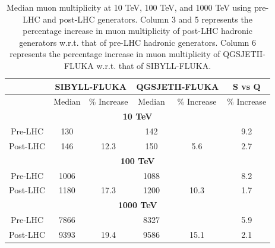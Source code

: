 \documentclass[12pt]{article}
\begin{document}
\begin{table}
\centering
\begin{tabular}{ | c | c | c | c | c | c |} 
\hline
& \multicolumn{2}{|c|}{\textbf{SIBYLL-FLUKA}} & \multicolumn{2}{|c|}{\textbf{QGSJETII-FLUKA}} & S vs Q \\
\hline
 & Median & \% Increase & Median & \% Increase & \% Increase \\
\hline 
\multicolumn{6}{|c|}{\textbf{10 TeV}} \\
\hline
Pre-LHC 	&	130	&	      & 142 &			& 9.2 \\
\hline
Post-LHC 	&	146	&	12.3      & 150 &	5.6		& 2.7 \\
\hline
\multicolumn{6}{|c|}{\textbf{100 TeV}} \\
\hline
Pre-LHC & 1006 &  & 1088 & & 8.2 \\
\hline
Post-LHC & 1180 & 17.3 & 1200 & 10.3 & 1.7 \\
\hline
\multicolumn{6}{|c|}{\textbf{1000 TeV}} \\
\hline
Pre-LHC & 7866 &  & 8327 & & 5.9\\
\hline
Post-LHC & 9393 & 19.4 & 9586 & 15.1 & 2.1\\
\hline
\end{tabular}
\caption{Median muon multiplicity at 10 TeV, 100 TeV, and 1000 TeV using pre-LHC and post-LHC generators. Column 3 and 5 represents the percentage increase in muon multiplicity of post-LHC hadronic generators w.r.t. that of pre-LHC hadronic generators. Column 6 represents the percentage increase in muon multiplicity of QGSJETII-FLUKA w.r.t. that of SIBYLL-FLUKA.\label{tab:muon_multiplicity_lhc}}
\end{table}
\end{document}
